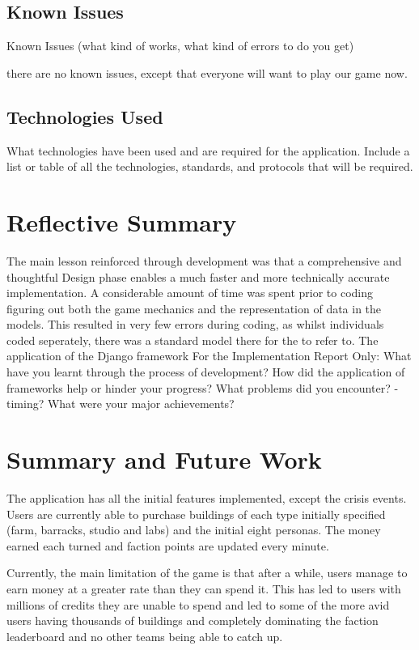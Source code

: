 \documentclass{sig-alt-release2}
\begin{document}
\subsection{Known Issues}

Known Issues (what kind of works, what kind of errors to do you get)

there are no known issues, except that everyone will want to play our game now.

\subsection{Technologies Used}

What technologies have been used and are required for the application. Include a list or table of all the technologies, standards, and protocols that will be required.

\section{Reflective Summary}

The main lesson reinforced through development was that a comprehensive and thoughtful Design phase enables a much faster and more technically accurate implementation. A considerable amount of time was spent prior to coding figuring out both the game mechanics and the representation of data in the models. This resulted in very few errors during coding, as whilst individuals coded seperately, there was a standard model there for the to refer to.
The application of the Django framework 
For the Implementation Report Only:
What have you learnt through the process of development? 
How did the application of frameworks help or hinder your progress?
What problems did you encounter? - timing?
What were your major achievements?


\section{Summary and Future Work}

The application has all the initial features implemented, except the crisis events. Users are currently able to purchase buildings of each type initially specified (farm, barracks, studio and labs) and the initial eight personas. The money earned each turned and faction points are updated every minute.

Currently, the main limitation of the game is that after a while, users manage to earn money at a greater rate than they can spend it. This has led to users with millions of credits they are unable to spend and led to some of the more avid users having thousands of buildings and completely dominating the faction leaderboard and no other teams being able to catch up.
\end{document}
